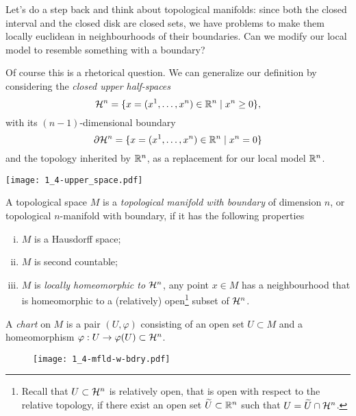 Let's do a step back and think about topological manifolds: since both the closed interval and the closed disk are closed sets, we have problems to make them locally euclidean in neighbourhoods of their boundaries.
Can we modify our local model to resemble something with a boundary?

Of course this is a rhetorical question.
We can generalize our definition by considering the \emph{closed upper half-spaces}
\begin{equation}
  \mathcal{H}^n = \{x=(x^1, \ldots, x^n)\in\mathbb{R}^n\mid x^n \geq 0\},
\end{equation}
with its $(n-1)$-dimensional boundary
\begin{equation}
  \partial\mathcal{H}^n = \{x=(x^1, \ldots, x^n)\in\mathbb{R}^n\mid x^n = 0\}
\end{equation}
and the topology inherited by $\mathbb{R}^n$, as a replacement for our local model $\mathbb{R}^n$.
%
\begin{marginfigure}
  \texttt{[image: 1\_4-upper\_space.pdf]}
\end{marginfigure}

\begin{definition}
  A topological space $M$ is a \emph{topological manifold with boundary} of dimension $n$, or topological $n$-manifold with boundary, if it has the following properties
  \begin{enumerate}[(i)]
    \item $M$ is a Hausdorff space;
    \item $M$ is second countable;
    \item $M$ is \emph{locally homeomorphic to $\mathcal{H}^n$}, any point $x\in M$ has a neighbourhood that is homeomorphic to a (relatively) open\footnote{Recall that $U\subset\mathcal{H}^n$ is relatively open, that is open with respect to the relative topology, if there exist an open set $\widetilde U\subset\mathbb{R}^n$ such that $U = \widetilde U \cap \mathcal{H}^n$.} subset of $\mathcal{H}^n$.
  \end{enumerate}

  A \emph{chart} on $M$ is a pair $(U, \varphi)$ consisting of an open set $U\subset M$ and a homeomorphism $\varphi: U \to \varphi(U)\subset \mathcal{H}^n$.
\end{definition}

\begin{figure}
  \texttt{[image: 1\_4-mfld-w-bdry.pdf]}
\end{figure}

